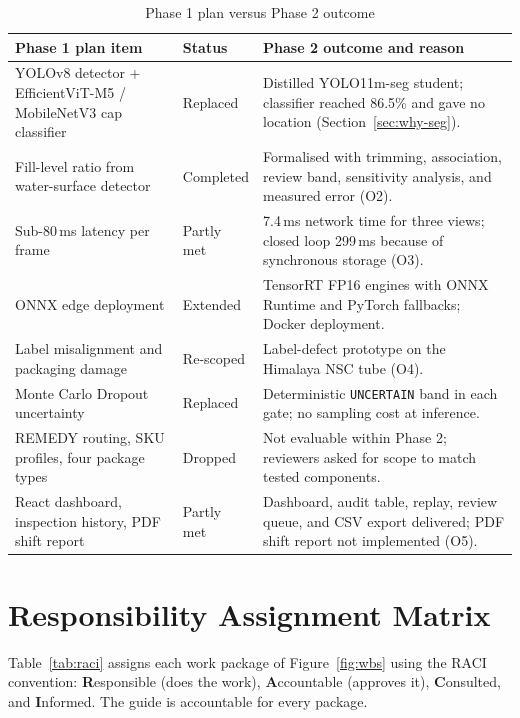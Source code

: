 \begin{table}[htbp]
\centering
\caption{Phase 1 plan versus Phase 2 outcome}
\label{tab:plan-actual}
\begin{tabularx}{\textwidth}{|L{4.0cm}|L{2.1cm}|X|}
\hline
\textbf{Phase 1 plan item} & \textbf{Status} & \textbf{Phase 2 outcome and reason} \\ \hline
YOLOv8 detector + EfficientViT-M5 / MobileNetV3 cap classifier & Replaced & Distilled YOLO11m-seg student; classifier reached 86.5\% and gave no location (Section~\ref{sec:why-seg}). \\ \hline
Fill-level ratio from water-surface detector & Completed & Formalised with trimming, association, review band, sensitivity analysis, and measured error (O2). \\ \hline
Sub-80\,ms latency per frame & Partly met & 7.4\,ms network time for three views; closed loop 299\,ms because of synchronous storage (O3). \\ \hline
ONNX edge deployment & Extended & TensorRT FP16 engines with ONNX Runtime and PyTorch fallbacks; Docker deployment. \\ \hline
Label misalignment and packaging damage & Re-scoped & Label-defect prototype on the Himalaya NSC tube (O4). \\ \hline
Monte Carlo Dropout uncertainty & Replaced & Deterministic \texttt{UNCERTAIN} band in each gate; no sampling cost at inference. \\ \hline
REMEDY routing, SKU profiles, four package types & Dropped & Not evaluable within Phase 2; reviewers asked for scope to match tested components. \\ \hline
React dashboard, inspection history, PDF shift report & Partly met & Dashboard, audit table, replay, review queue, and CSV export delivered; PDF shift report not implemented (O5). \\ \hline
\end{tabularx}
\end{table}

\section{Responsibility Assignment Matrix}
\label{sec:raci}
Table~\ref{tab:raci} assigns each work package of Figure~\ref{fig:wbs} using the RACI convention: \textbf{R}esponsible (does the work), \textbf{A}ccountable (approves it), \textbf{C}onsulted, and \textbf{I}nformed. The guide is accountable for every package.

